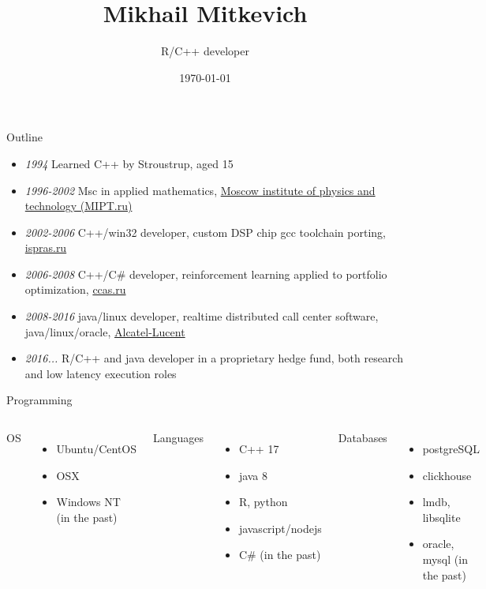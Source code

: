 \documentclass[10pt]{beamer}
\title{Mikhail Mitkevich}
\subtitle{R/C++ developer}
\date{\today}
\begin{document}
\maketitle

\begin{frame}[fragile]{Outline}

\begin{itemize}
\item  \textit{1994} Learned C++ by Stroustrup, aged 15
\item  \textit{1996-2002} Msc in applied mathematics, \href{https://www.timeshighereducation.com/world-university-rankings/moscow-institute-physics-and-technology}{Moscow institute of physics and technology (MIPT.ru)} 
\item \textit{2002-2006} C++/win32 developer, custom DSP chip gcc toolchain porting, \href{http://www.ispras.ru/en/}{ispras.ru} 
\item \textit{2006-2008} C++/C\# developer, reinforcement learning applied to portfolio optimization, \href{http://www.ccas.ru/index-e.htm}{ccas.ru}
\item  \textit{2008-2016} java/linux developer, realtime distributed call center software, java/linux/oracle,  \href{https://en.wikipedia.org/wiki/Alcatel-Lucent}{Alcatel-Lucent}
\item  \textit{2016...} R/C++ and java developer in a proprietary hedge fund, both research and low latency execution roles
\end{itemize}
\end{frame}

\begin{frame}{Programming}
  \begin{columns}[T,onlytextwidth]
      OS
      \begin{itemize}
        \item Ubuntu/CentOS
        \item OSX 
        \item Windows NT (in the past)
      \end{itemize}

      Languages
      \begin{itemize}
        \item C++ 17
        \item java 8
        \item R, python
        \item javascript/nodejs
        \item C\# (in the past)
      \end{itemize}

      Databases
      \begin{itemize}
        \item postgreSQL
        \item clickhouse
        \item lmdb, libsqlite
        \item oracle, mysql (in the past)
      \end{itemize}
  \end{columns}
\end{frame}
\end{document}
